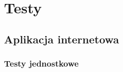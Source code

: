 \documentclass[eng,oneside]{mgr}
\begin{document}
\chapter{Testy}
\section{Aplikacja internetowa}
\subsection{Testy jednostkowe}




\end{document}
